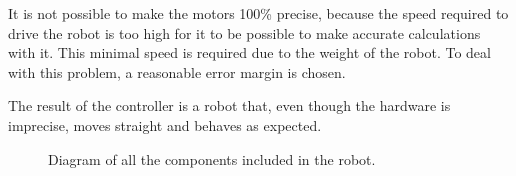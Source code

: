 It is not possible to make the motors 100\% precise, because the speed required to drive the robot is too high for it to be possible to make accurate calculations with it. This minimal speed is required due to the weight of the robot. To deal with this problem, a reasonable error margin is chosen. 

The result of the controller is a robot that, even though the hardware is imprecise, moves straight and behaves as expected.

\begin{figure}[H]
     \caption{\label{fig:robot_overview} Diagram of all the components included in the robot.}
\end{figure}

